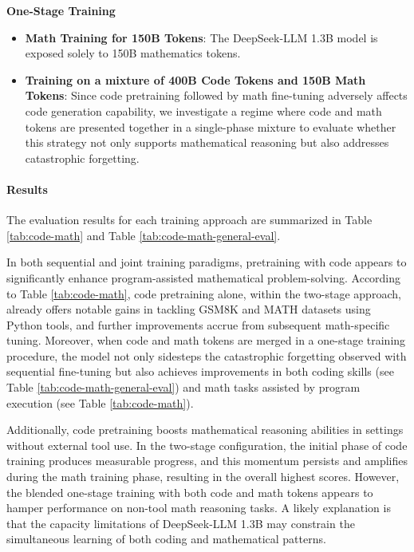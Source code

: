 {\textbf{One-Stage Training}

\begin{itemize}[topsep=0pt]
    \item \textbf{Math Training for 150B Tokens}: The DeepSeek-LLM 1.3B model is exposed solely to 150B mathematics tokens.
    \item \textbf{Training on a mixture of 400B Code Tokens and 150B Math Tokens}: Since code pretraining followed by math fine-tuning adversely affects code generation capability, we investigate a regime where code and math tokens are presented together in a single-phase mixture to evaluate whether this strategy not only supports mathematical reasoning but also addresses catastrophic forgetting.
\end{itemize}

\paragraph{Results}
The evaluation results for each training approach are summarized in Table \ref{tab:code-math} and Table \ref{tab:code-math-general-eval}.

In both sequential and joint training paradigms, pretraining with code appears to significantly enhance program-assisted mathematical problem-solving. According to Table \ref{tab:code-math}, code pretraining alone, within the two-stage approach, already offers notable gains in tackling GSM8K and MATH datasets using Python tools, and further improvements accrue from subsequent math-specific tuning. Moreover, when code and math tokens are merged in a one-stage training procedure, the model not only sidesteps the catastrophic forgetting observed with sequential fine-tuning but also achieves improvements in both coding skills (see Table \ref{tab:code-math-general-eval}) and math tasks assisted by program execution (see Table \ref{tab:code-math}).

Additionally, code pretraining boosts mathematical reasoning abilities in settings without external tool use. In the two-stage configuration, the initial phase of code training produces measurable progress, and this momentum persists and amplifies during the math training phase, resulting in the overall highest scores. However, the blended one-stage training with both code and math tokens appears to hamper performance on non-tool math reasoning tasks. A likely explanation is that the capacity limitations of DeepSeek-LLM 1.3B may constrain the simultaneous learning of both coding and mathematical patterns.

}
